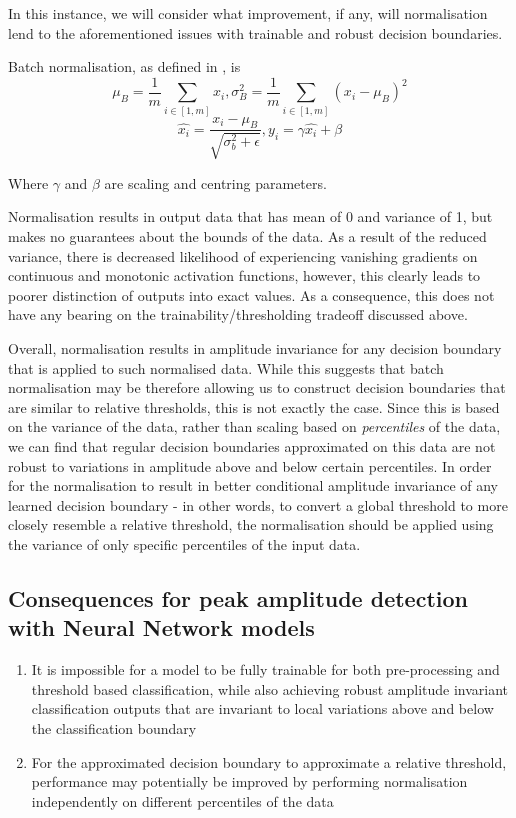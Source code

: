 \documentclass[9pt,conference]{IEEEtran}
\begin{document}
In this instance, we will consider what improvement, if any, will normalisation lend to the aforementioned issues with trainable and robust decision boundaries.

Batch normalisation, as defined in \cite{invariantsWithDNN}, is
\begin{equation*}
    \mu_B = \frac{1}{m}\sum_{i \in \left[1,m\right]}x_i, \sigma_B^2 = \frac{1}{m}\sum_{i \in \left[1,m\right]}\left(x_i-\mu_B\right)^2
\end{equation*}
\begin{equation*}
    \hat{x_i} = \frac{x_i-\mu_B}{\sqrt{\sigma_b^2+\epsilon}}, y_i = \gamma\hat{x_i}+\beta
\end{equation*}

Where $\gamma$ and $\beta$ are scaling and centring parameters.

Normalisation results in output data that has mean of 0 and variance of 1, but makes no guarantees about the bounds of the data. As a result of the reduced variance, there is decreased likelihood of experiencing vanishing gradients on continuous and monotonic activation functions, however, this clearly leads to poorer distinction of outputs into exact values. As a consequence, this does not have any bearing on the trainability/thresholding tradeoff discussed above.

Overall, normalisation results in amplitude invariance for any decision boundary that is applied to such normalised data. While this suggests that batch normalisation may be therefore allowing us to construct decision boundaries that are similar to relative thresholds, this is not exactly the case. Since this is based on the variance of the data, rather than scaling based on \textit{percentiles} of the data, we can find that regular decision boundaries approximated on this data are not robust to variations in amplitude above and below certain percentiles. In order for the normalisation to result in better conditional amplitude invariance of any learned decision boundary - in other words, to convert a global threshold to more closely resemble a relative threshold, the normalisation should be applied using the variance of only specific percentiles of the input data.


\subsection{Consequences for peak amplitude detection with Neural Network models}

\begin{enumerate}
    \item It is impossible for a model to be fully trainable for both pre-processing and threshold based classification, while also achieving robust amplitude invariant classification outputs that are invariant to local variations above and below the classification boundary
    \item For the approximated decision boundary to approximate a relative threshold, performance may potentially be improved by performing normalisation independently on different percentiles of the data 
\end{enumerate}
\end{document}
